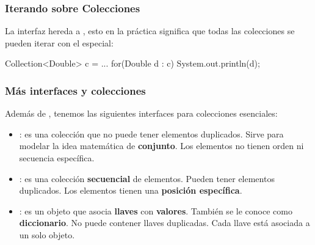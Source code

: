 \documentclass{beamer}
\begin{document}
\begin{frame}[fragile]
  \frametitle{Iterando sobre Colecciones}
  La interfaz  hereda a ,
  esto en la práctica significa que todas las colecciones se pueden
  iterar con el  especial:

  \begin{jsmall}
    Collection<Double> c = ...
    for(Double d : c) {
      System.out.println(d);
    }
  \end{jsmall}
\end{frame}

\begin{frame}[fragile]
  \frametitle{Más interfaces y colecciones}

  Además de , tenemos las siguientes interfaces para
  colecciones esenciales:

  \begin{itemize}

  \item {}: es una colección que no puede tener elementos
    duplicados. Sirve para modelar la idea matemática de
    \textbf{conjunto}. Los elementos no tienen orden ni secuencia
    específica.

  \item {}: es una colección \textbf{secuencial} de
    elementos. Pueden tener elementos duplicados. Los elementos tienen
    una \textbf{posición específica}.
    
  \item {}: es un objeto que asocia \textbf{llaves} con
    \textbf{valores}. También se le conoce como
    \textbf{diccionario}. No puede contener llaves duplicadas. Cada
    llave está asociada a un solo objeto.
    
  \end{itemize}
  
\end{frame}
\end{document}
